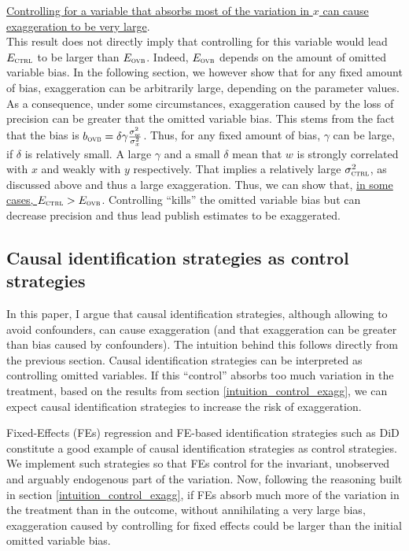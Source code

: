 \documentclass[a4paper, 11pt]{report}
\begin{document}
			\ul{Controlling for a variable that absorbs most of the variation in $x$ can cause exaggeration to be very large}.\\
			
			This result does not directly imply that controlling for this variable would lead $E_{\textsc{ctrl}}$ to be larger than $E_{\textsc{ovb}}$. Indeed, $E_{\textsc{ovb}}$ depends on the amount of omitted variable bias. In the following section, %
			we however show that for any fixed amount of bias, exaggeration can be arbitrarily large, depending on the parameter values. As a consequence, under some circumstances, exaggeration caused by the loss of precision can be greater that the omitted variable bias. This stems from the fact that the bias is $b_{\textsc{ovb}} = \delta \gamma \frac{\sigma_{w}^{2}}{\sigma_{x}^{2}}$. Thus, for any fixed amount of bias, $\gamma$ can be large, if $\delta$ is relatively small. A large $\gamma$ and a small $\delta$ mean that $w$ is strongly correlated with $x$ and weakly with $y$ respectively. That implies a relatively large $\sigma_{\textsc{ctrl}}^{2}$, as discussed above and thus a large exaggeration. Thus, we can show that, \ul{in some cases, $E_{\textsc{ctrl}} > E_{\textsc{ovb}}$}. Controlling ``kills'' the omitted variable bias but can decrease precision and thus lead publish estimates to be exaggerated.
			
		\subsection{Causal identification strategies as control strategies}
		
			In this paper, I argue that causal identification strategies, although allowing to avoid confounders, can cause exaggeration (and that exaggeration can be greater than bias caused by confounders). The intuition behind this follows directly from the previous section. Causal identification strategies can be interpreted as controlling omitted variables. If this ``control'' absorbs too much variation in the treatment, based on the results from section \ref{intuition_control_exagg}, we can expect causal identification strategies to increase the risk of exaggeration.
			
			Fixed-Effects (FEs) regression and FE-based identification strategies such as DiD constitute a good example of causal identification strategies as control strategies. We implement such strategies so that FEs control for the invariant, unobserved and arguably endogenous part of the variation. Now, following the reasoning built in section \ref{intuition_control_exagg}, if FEs absorb much more of the variation in the treatment than in the outcome, without annihilating a very large bias, exaggeration caused by controlling for fixed effects could be larger than the initial omitted variable bias.
			
\end{document}
